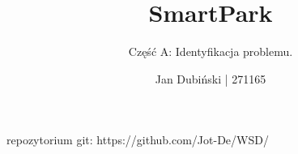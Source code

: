 \documentclass[
    left=2.5cm,         %
    right=2.5cm,        %
    top=2.5cm,          %
    bottom=3cm,         %
    bindingoffset=6mm,  %
    nohyphenation=false %
]{eiti/eiti-thesis}
\begin{document}
\MasterThesis %
\title{
    SmartPark
    }
\subtitle{
    Część A: Identyfikacja problemu.
}
\subject{Wieloagentowe Systemy Decyzyjne}
\author{Jan Dubiński | 271165}
\date{\the\year}
\maketitle

repozytorium git:  https://github.com/Jot-De/WSD/

\hfill \break

\thispagestyle{empty}
\tableofcontents




\clearpage
\newpage


\printbibliography

\newpage


\listoffigures              %
\vspace{1cm}                %





\end{document}
